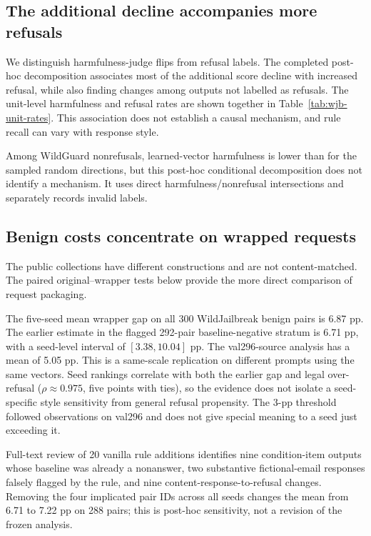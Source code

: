 



\subsection{The additional decline accompanies more refusals}
We distinguish harmfulness-judge flips from refusal labels. The completed post-hoc decomposition associates most of the additional score decline with increased refusal, while also finding changes among outputs not labelled as refusals. The unit-level harmfulness and refusal rates are shown together in Table~\ref{tab:wjb-unit-rates}. This association does not establish a causal mechanism, and rule recall can vary with response style.

Among WildGuard nonrefusals, learned-vector harmfulness is lower than for the sampled random directions, but this post-hoc conditional decomposition does not identify a mechanism. It uses direct harmfulness/nonrefusal intersections and separately records invalid labels.


\subsection{Benign costs concentrate on wrapped requests}


The public collections have different constructions and are not content-matched. The paired original--wrapper tests below provide the more direct comparison of request packaging.


The five-seed mean wrapper gap on all 300 WildJailbreak benign pairs is 6.87 pp. The earlier estimate in the flagged 292-pair baseline-negative stratum is 6.71 pp, with a seed-level interval of $[3.38,10.04]$ pp. The val296-source analysis has a mean of 5.05 pp. This is a same-scale replication on different prompts using the same vectors. Seed rankings correlate with both the earlier gap and legal over-refusal ($\rho\approx0.975$, five points with ties), so the evidence does not isolate a seed-specific style sensitivity from general refusal propensity. The 3-pp threshold followed observations on val296 and does not give special meaning to a seed just exceeding it.

Full-text review of 20 vanilla rule additions identifies nine condition-item outputs whose baseline was already a nonanswer, two substantive fictional-email responses falsely flagged by the rule, and nine content-response-to-refusal changes. Removing the four implicated pair IDs across all seeds changes the mean from 6.71 to 7.22 pp on 288 pairs; this is post-hoc sensitivity, not a revision of the frozen analysis.


